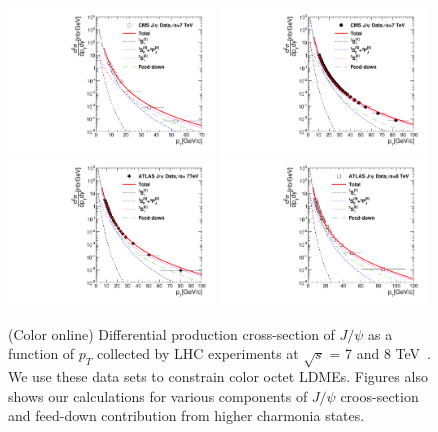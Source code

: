 \documentclass[aps,prc,preprint,superscriptaddress,showpacs,showkeys,amsmath]{revtex4-1}
\begin{document}
\begin{figure}
\includegraphics[width=0.49\textwidth]{Figures/JPsi/CMS_New_D2NDPtDy_PromptJPsi_Y0009_Pt.pdf}
\includegraphics[width=0.49\textwidth]{Figures/JPsi/CMS_Latest_D2NDPtDy_PromptJPsi_Y0012_Pt.pdf}
\includegraphics[width=0.49\textwidth]{Figures/JPsi/ATLAS_New_D2NDPtDy_PromptJPsi_Y0025_Pt.pdf}
\includegraphics[width=0.49\textwidth]{Figures/JPsi/ATLAS_8TeV_D2NDPtDy_PromptJPsi_Y0025_Pt.pdf}
\caption{(Color online) Differential production cross-section of $J/\psi$ as a function of $p_{T}$ 
collected by LHC experiments at $\sqrt{s}$ = 7 and 8 TeV~\cite{Chatrchyan:2011kc,Khachatryan:2015rra,Aad:2015duc}. 
We use these data sets to constrain color octet LDMEs. Figures also shows our calculations for various components 
of $J/\psi$ croos-section and feed-down contribution from higher charmonia states.}
\label{Fig:LDMEJPsi}
\end{figure}
\end{document}

